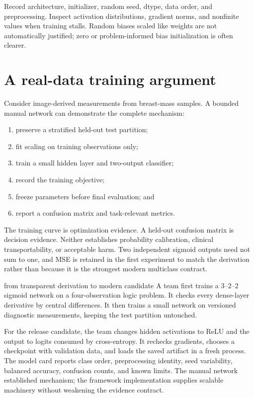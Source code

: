 Record architecture, initializer, random seed, dtype, data order, and
preprocessing. Inspect activation distributions, gradient norms, and
nonfinite values when training stalls. Random biases scaled like weights are
not automatically justified; zero or problem-informed bias initialization is
often clearer.

\section{A real-data training argument}

Consider image-derived measurements from breast-mass samples. A bounded manual
network can demonstrate the complete mechanism:
\begin{enumerate}
  \item preserve a stratified held-out test partition;
  \item fit scaling on training observations only;
  \item train a small hidden layer and two-output classifier;
  \item record the training objective;
  \item freeze parameters before final evaluation; and
  \item report a confusion matrix and task-relevant metrics.
\end{enumerate}

The training curve is optimization evidence. A held-out confusion matrix is
decision evidence. Neither establishes probability calibration, clinical
transportability, or acceptable harm. Two independent sigmoid outputs need
not sum to one, and MSE is retained in the first experiment to match the
derivation rather than because it is the strongest modern multiclass contract.

\begin{workedexample}{from transparent derivation to modern candidate}
A team first trains a $3$--$2$--$2$ sigmoid network on a four-observation logic
problem. It checks every dense-layer derivative by central differences. It then
trains a small network on versioned diagnostic measurements, keeping the test
partition untouched.

For the release candidate, the team changes hidden activations to ReLU and the
output to logits consumed by cross-entropy. It rechecks gradients, chooses a
checkpoint with validation data, and loads the saved artifact in a fresh
process. The model card reports class order, preprocessing identity, seed
variability, balanced accuracy, confusion counts, and known limits. The manual
network established mechanism; the framework implementation supplies scalable
machinery without weakening the evidence contract.
\end{workedexample}

